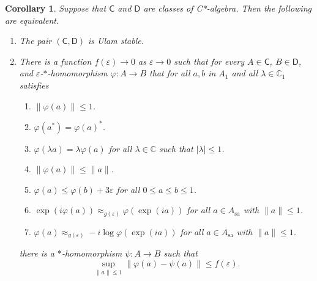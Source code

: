 \documentclass[10pt,a4paper]{amsart}
\newtheorem{corollary}{Corollary}
\newcommand{\bbC}{\mathbb C}
\newcommand{\cstar}{C*}
\newcommand{\sfC}{\mathsf C}
\newcommand{\sfD}{\mathsf D}
\begin{document}
\begin{corollary}\label{C.UlamStableCorrected}
Suppose that $\sfC$ and $\sfD$  are classes of \cstar-algebra. Then the following are equivalent. 
\begin{enumerate}
	\item\label{1.C.Ulam.Corrected} The pair $(\sfC,\sfD)$ is Ulam stable. 
\item\label{2.C.Ulam.Corrected} There is a function $f(\varepsilon)\to 0$ as $\varepsilon\to 0$ such that for every $A\in \sfC$, $B\in \sfD$, and $\varepsilon$-$*$-homomorphism $\varphi\colon A\to B$  that for all $a,b$ in $A_1$ and all $\lambda\in \bbC_1$ satisfies
\begin{enumerate}[label=(C\arabic*)]
	\item\label{Corrected.norm} $\|\varphi(a)\|\leq 1$.
	\item \label{Corrected.*} $\varphi(a^*)=\varphi(a)^*$. 
	\item \label{Corrected.scalar} $\varphi(\lambda a)=\lambda \varphi(a)$ for all $\lambda\in \bbC$ such that $|\lambda|\leq 1$. 
	\item \label{Corrected.ctns}$\|\varphi(a)\|\leq \|a\|$. 
	\item \label{Corrected.leq} $\varphi(a)\leq \varphi(b)+3\varepsilon$ for all $0\leq a\leq b\leq 1$. 
	\item \label{Corrected.exp} $\exp(i\varphi(a))\approx_{g(\varepsilon )}\varphi(\exp(i a))$ for all $a\in A_{\textrm{sa}}$ with $\|a\|\leq 1$. 
	\item \label{Corrected.log} $\varphi(a)\approx_{g(\varepsilon)} -i \log \varphi(\exp(ia))$ for all $a\in A_{\textrm{sa}}$ with $\|a\|\leq 1$.
\end{enumerate}
%
there is a $*$-homomorphism $\psi\colon A\to B$ such that $$\sup_{\|a\|\le 1}\|\varphi(a)-\psi(a)\|\le f(\varepsilon).$$
\end{enumerate}
\end{corollary}
\end{document}
